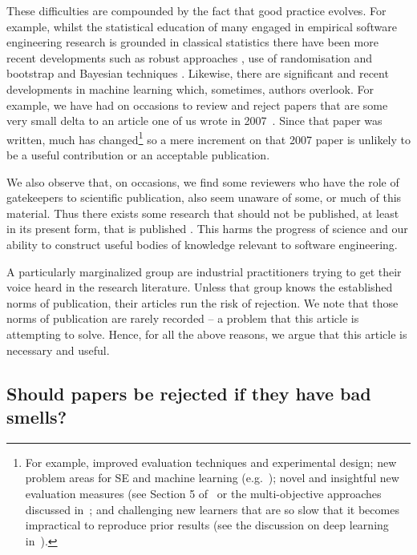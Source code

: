 \documentclass[10pt]{elsarticle}
\newcommand{\RED}{\color{black}}
\begin{document}
These difficulties are compounded by the fact that good practice evolves.  For example, whilst the statistical education of many engaged in empirical software engineering research is grounded in classical statistics there have been more recent developments such as robust approaches \cite{Kitc17}, use of randomisation and bootstrap \cite{Carp00} and Bayesian techniques \cite{Gelm13}.  Likewise, there are significant and recent developments in machine learning which, sometimes, authors overlook. For example, we have had on occasions to review and reject papers that are some very small delta to an article one of us wrote in 2007~\cite{menzies07}. Since that paper was written, much has changed\footnote{For example, improved evaluation techniques and experimental design; new problem areas for SE and machine learning (e.g.~\cite{sarkar2015cost});
 novel and insightful new evaluation measures (see Section 5 of~\cite{huang2017supervised} or the multi-objective approaches discussed in~\cite{nair2018data}; and challenging new learners that are so slow that it becomes impractical to reproduce prior results (see the discussion on deep learning in~\cite{fu2017easy}).} so a mere increment on that 2007 paper is unlikely to be a useful contribution or an acceptable publication. 

We also observe that, on occasions, we find some reviewers who have the role of gatekeepers to scientific publication, also seem unaware of some, or much of this material.  Thus there exists some research that should not be published, at least in its present form, that is published \cite{Kitc02,Jorg16}.  This harms the progress of science and our ability to construct useful bodies of knowledge relevant to software engineering.
 
A particularly marginalized group are industrial practitioners trying to get their voice heard in the research literature.  Unless that group knows the established norms of publication, their articles run the risk of rejection. We note that those norms of publication are rarely recorded -- a problem that this article is attempting to solve.  Hence, for all the above reasons, we argue that this article is necessary and useful.

\RED \subsection{Should papers be rejected if they have bad smells?}\label{tion:reject}
\end{document}
